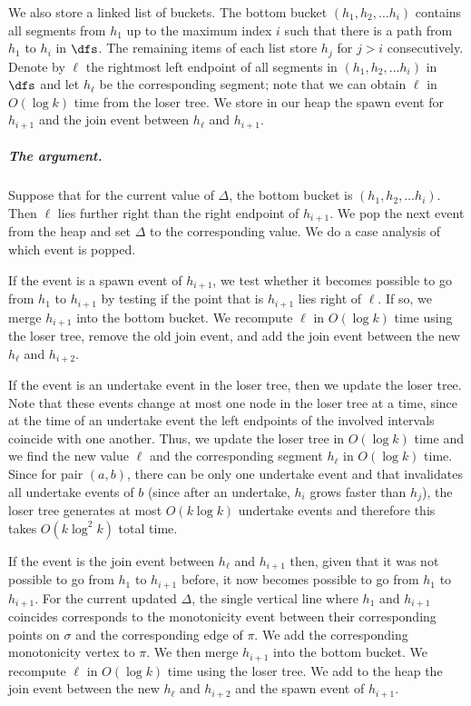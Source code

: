 \documentclass[english, thm-restate, notab]{lipics-v2021}
\begin{document}
We  also store a linked list of buckets. 
The bottom bucket $(h_1, h_2, \ldots h_i)$  contains all segments from $h_1$ up to the maximum index $i$ such that there is a path from $h_1$ to $h_i$ in $\dfs$. 
The remaining items of each list store $h_j$ for $j > i$ consecutively. 
Denote by $\ell$ the rightmost left endpoint of all segments in $(h_1, h_2, \ldots h_i)$ in $\dfs$ and let $h_\ell$ be the corresponding segment; note that we can obtain $\ell$ in $O(\log k)$ time from the loser tree.  We store in our heap the spawn event for $h_{i+1}$ and the join event between $h_\ell$ and $h_{i+1}$.

\subparagraph{The argument.}
Suppose that for the current value of $\Delta$, the bottom bucket is $(h_1, h_2, \ldots h_i)$.
Then $\ell$ lies further right than the right endpoint of $h_{i+1}$. 
We pop the next event from the heap and set $\Delta$ to the corresponding value. 
We do a case analysis of which event is popped. 


If the event is a spawn event of $h_{i+1}$, we test whether it becomes possible to go from $h_1$ to $h_{i+1}$ by testing if the point that is $h_{i+1}$ lies right of $\ell$. 
If so, we merge $h_{i+1}$ into the bottom bucket. 
We recompute $\ell$ in $O(\log k)$ time using the loser tree, remove the old join event, and add the join event between the new $h_\ell$ and $h_{i+2}$. 



If the event is an undertake event in the loser tree, then we update the loser tree.
Note that these events change at most one node in the loser tree at a time, since at the time of an undertake event the left endpoints of the involved intervals coincide with one another.
Thus, we update the loser tree in $O(\log k)$ time and we find the new value $\ell$ and the corresponding segment $h_\ell$ in $O(\log k)$ time. 
Since for pair $(a, b)$, there can be only one undertake event and that invalidates all undertake events of $b$ (since after an undertake, $h_i$ grows faster than $h_j$), the loser tree generates at most $O(k \log k)$ undertake events and therefore this takes $O(k \log^2 k)$ total time. 


If the event is the join event between $h_\ell$ and $h_{i+1}$ then, given that it was not possible to go from $h_1$ to $h_{i+1}$ before, it now becomes possible to go from $h_1$ to $h_{i+1}$. 
For the current updated $\Delta$, the single vertical line where $h_1$ and $h_{i+1}$ coincides corresponds to the monotonicity event between their corresponding points on $\sigma$ and the corresponding edge of $\pi$. We add the corresponding monotonicity vertex to $\pi$.
We then merge $h_{i+1}$ into the bottom bucket. 
We recompute $\ell$ in $O(\log k)$ time using the loser tree. We add to the heap the join event between the new $h_\ell$ and $h_{i+2}$ and the spawn event of $h_{i+1}$. 
\end{document}
